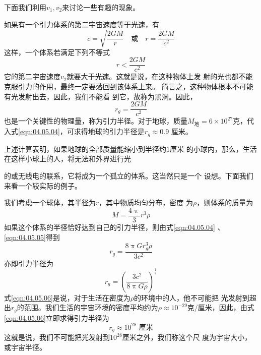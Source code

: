 下面我们利用$ v _ 1 , v _ 2 $来讨论一些有趣的现象。

如果有一个引力体系的第二宇宙速度等于光速，有
\begin{equation*}
  c = \sqrt { \frac { 2 G M } { r } } \quad
  \text{或} \quad
  r = \frac { 2 G M } { c ^ { 2 } }
\end{equation*}
这样，一个体系若满足下列不等式
\begin{equation*}
  r < \frac { 2 G M } { c ^ { 2 } }
\end{equation*}
它的第二宇宙速度$ v_2 $就要大于光速。这就是说，在这种物体上发
射的光也都不能克服引力的作用，最终一定要落回到该体系上来。
简言之，这种物体根本不可能有光发射出去，因此，我们不能看
到它，故称为黑洞。因此，
\begin{equation}\label{eqn:04.05.04}
  r _ { g } = \frac { 2 G M } { c ^ { 2 } }
\end{equation}
也是一个关键性的物理量，称为引力半径。对于地球，质量$ M _ { \text{地} }= 6 \times 1 0 ^ { 2 7 } $克，代入式\eqref{eqn:04.05.04}，可求得地球的引力半径是$ r _ { g } \approx 0 . 9 $
厘米。

上述计算表明，如果地球的全部质量能缩小到半径约$ 1 $厘米
的小球内，那么，生活在这样小球上的人，将无法和外界进行光

\clearpage\noindent
的或无线电的联系，它将成为一个孤立的体系。这当然只是一个
设想。下面我们来看一个较实际的例子。

我们考虑一个球体，其半径为$ r $，其中物质均匀分布，密度
为$ \rho $，则体系的质量为
\begin{equation}\label{eqn:04.05.05}
  M = \frac { 4 \uppi } { 3 } r ^ { 3 } \rho
\end{equation}
如果这个体系的半径恰好达到自己的引力半径，则由式\eqref{eqn:04.05.04} 、\eqref{eqn:04.05.05}得到
\begin{equation*}
  r _ { g } = \frac { 8 \uppi G r _ { g } ^ { 3 } \rho } { 3 c ^ { 2 } }
\end{equation*}
亦即引力半径为
\begin{equation}\label{eqn:04.05.06}
  r _ { g } = \left( \frac { 3 c ^ { 2 } } { 8 \uppi G \rho } \right) ^ { \frac { 1 } { 2 } }
\end{equation}
式\eqref{eqn:04.05.06}是说，对于生活在密度为$ \rho $的环境中的人，他不可能把
光发射到超出$ r_g $的范围。我们生活的宇宙环境的密度平均约为$ \rho
  \approx 10 ^ {-29}$克/厘米，因此，由式\eqref{eqn:04.05.06}立即求得引力半径为
\begin{equation*}
  r _ g \approx 10 ^ {28}\text{ 厘米}
\end{equation*}
这就是说，我们不可能把光发射到$ 10 ^ {28} $厘米之外，我们称这个尺
度为宇宙大小，或宇宙半径。

